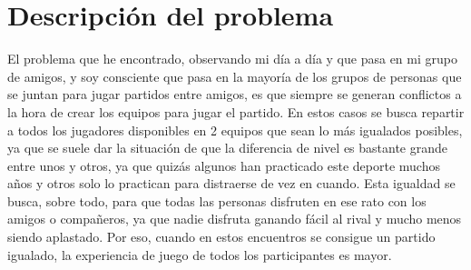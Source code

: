 \chapter{Descripción del problema}

El problema que he encontrado, observando mi día a día y que pasa en mi grupo de amigos, y soy consciente que pasa en la mayoría de los grupos de personas que se juntan para jugar partidos entre amigos, 
es que siempre se generan conflictos a la hora de crear los equipos para jugar el partido. 
En estos casos se busca repartir a todos los jugadores disponibles en 2 equipos que sean lo más igualados posibles, ya que se suele dar la situación de que la diferencia de nivel es bastante grande entre unos y otros,
ya que quizás algunos han practicado este deporte muchos años y otros solo lo practican para distraerse de vez en cuando.
Esta igualdad se busca, sobre todo, para que todas las personas disfruten en ese rato con los amigos o compañeros, ya que nadie disfruta ganando fácil al rival y mucho menos siendo aplastado. Por eso, cuando en estos encuentros se consigue
un partido igualado, la experiencia de juego de todos los participantes es mayor. 